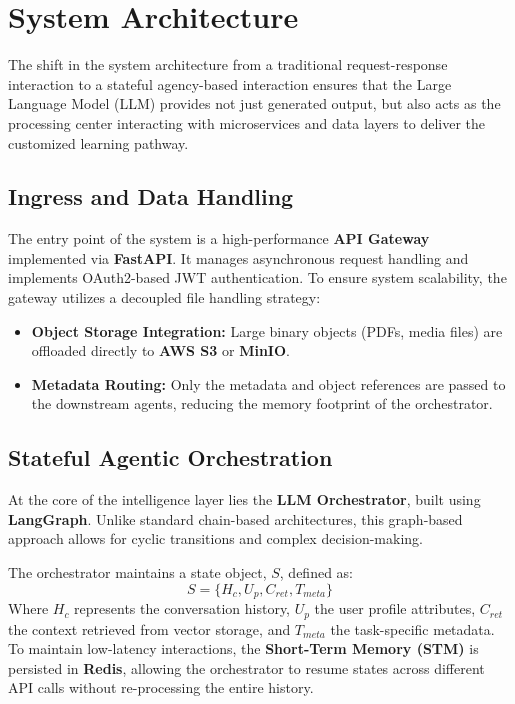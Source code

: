 \section{System Architecture}
The shift in the system architecture from a traditional request-response interaction to a
stateful agency-based interaction ensures that the Large Language Model (LLM)
provides not just generated output, but also acts as the processing center interacting
with microservices and data layers to deliver the customized learning pathway.

\subsection{Ingress and Data Handling}
The entry point of the system is a high-performance \textbf{API Gateway} implemented via \textbf{FastAPI}. It manages asynchronous request handling and implements OAuth2-based JWT authentication. To ensure system scalability, the gateway utilizes a decoupled file handling strategy:
\begin{itemize}
	\item \textbf{Object Storage Integration:} Large binary objects (PDFs, media files) are offloaded directly to \textbf{AWS S3} or \textbf{MinIO}.
	\item \textbf{Metadata Routing:} Only the metadata and object references are passed to the downstream agents, reducing the memory footprint of the orchestrator.
\end{itemize}

\subsection{Stateful Agentic Orchestration}
At the core of the intelligence layer lies the \textbf{LLM Orchestrator}, built using \textbf{LangGraph}. Unlike standard chain-based architectures, this graph-based approach allows for cyclic transitions and complex decision-making.

The orchestrator maintains a state object, $S$, defined as:
\[ S = \{ H_c, U_p, C_{ret}, T_{meta} \} \]
Where $H_c$ represents the conversation history, $U_p$ the user profile attributes, $C_{ret}$ the context retrieved from vector storage, and $T_{meta}$ the task-specific metadata. To maintain low-latency interactions, the \textbf{Short-Term Memory (STM)} is persisted in \textbf{Redis}, allowing the orchestrator to resume states across different API calls without re-processing the entire history.

